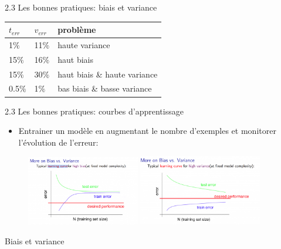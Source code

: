 \begin{frame}{2.3 Les bonnes pratiques: biais et variance}
\begin{minipage}{.39\textwidth}
\begin{center}
    \end{center}
  \end{minipage}
  \begin{minipage}{.59\textwidth}
    \begin{table}
      \begin{tabular}{l|l|l}
        $t_{err}$ & $v_{err}$ & problème \\
        \hline
        1$\%$ & 11$\%$ & haute variance \\
        15$\%$ & 16$\%$ & haut biais \\
        15$\%$ & 30$\%$ & haut biais \& haute variance \\
        0.5$\%$ & 1$\%$ & bas biais \& basse variance \\
      \end{tabular}
    \end{table}
  \end{minipage}
\end{frame}

\begin{frame}{2.3 Les bonnes pratiques: courbes d'apprentissage}
  \begin{itemize}
  \item Entrainer un modèle en augmentant le nombre d'exemples et monitorer l'évolution de l'erreur:
  \end{itemize}
  \begin{figure}
    \includegraphics[trim = {0 0 0 32}, clip, width=0.44\textwidth]{figs/learningCurves1.png}
    \includegraphics[trim = {0 0 0 30}, clip, width=0.48\textwidth]{figs/learningCurves2.png}
  \end{figure}
  \vspace{-0.5cm}
  \begin{center}
    \scriptsize
    Biais et variance \href{https://www.coursera.org/learn/machine-learning}{\color{blue}{[Coursera]}}
  \end{center}  
\end{frame}

